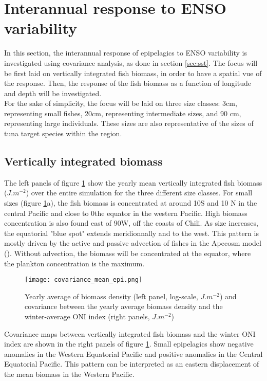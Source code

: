 \section{Interannual response to ENSO variability}

In this section, the interannual response of epipelagics to ENSO variability is investigated using covariance analysis, as done in section \ref{sec:sst}. 
The focus will be first laid on vertically integrated 
fish biomass, in order to have a spatial vue of the response. Then, the response of the fish biomass as a function of longitude and depth will be investigated.\\

For the sake of simplicity, the focus will be laid on three size classes: 3cm, representing small fishes, 20cm, representing intermediate sizes, and 90 cm, representing large individuals. These sizes are also
representative of the sizes of tuna target species within the region.\\

\subsection{Vertically integrated biomass}

The left panels of figure \ref{fig:mean-cov-ape} show the yearly mean vertically integrated fish biomass ($J.m^{-2}$) over the entire simulation for the three different size classes. For small sizes (figure \ref{fig:mean-cov-ape}a), the fish biomass is concentrated at around 10\degree S and 10 \degree N in the central Pacific and close to 0the equator in the western Pacific. High biomass concentration is also found east of 90\degree W, off the coasts of Chili. As size increases, the equatorial "blue spot" extends meridionnally and to the west. This pattern is mostly driven by the active and passive advection of fishes in the Apecosm model (). Without advection, the biomass will be concentrated at the equator, where the plankton concentration is the maximum. 

\begin{figure}[h!]
    \centering
    \texttt{[image: covariance\_mean\_epi.png]}
    \caption{Yearly average of biomass density (left panel, log-scale, $J.m^{-2}$) and 
    covariance between the yearly average biomass density and the winter-average ONI index (right panels, $J.m^{-2}$)}
    \label{fig:mean-cov-ape}
\end{figure}

Covariance maps between vertically integrated fish biomass and the winter ONI index are shown in the right panels of figure \ref{fig:mean-cov-ape}. 
Small epipelagics show negative anomalies in the Western Equatorial Pacific and positive anomalies in the Central Equatorial Pacific. This pattern can be interpreted as an eastern displacement of the mean biomass in the Western Pacific.\\

